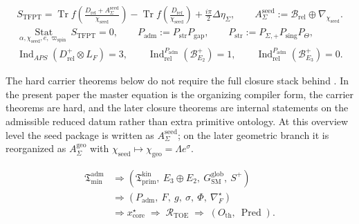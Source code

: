 \documentclass[11pt,a4paper]{article}
\theoremstyle{definition}
\theoremstyle{remark}
\newcommand{\Seam}{\Sigma}
\newcommand{\SM}{\mathrm{SM}}
\newcommand{\Pred}{\operatorname{Pred}}
\newcommand{\Tmin}{\mathfrak T_{\mathrm{min}}}
\newcommand{\Tprim}{\mathfrak T_{\mathrm{prim}}}
\newcommand{\chiseed}{\chi_{\mathrm{seed}}}
\newcommand{\chigeo}{\chi_{\mathrm{geo}}}
\newcommand{\Padm}{P_{\mathrm{adm}}}
\newcommand{\wspin}{\varpi_{\mathrm{spin}}}
\begin{document}
\begin{tcolorbox}[colback=tfptblue!3, colframe=tfptblue, breakable,
    title={TFPT master equation and selectors}, colbacktitle=tfptblue]
\begin{equation}
\label{eq:tfpt-master}
\begin{aligned}
S_{\mathrm{TFPT}}
=
\operatorname{Tr}f\!\left(\frac{D_{\mathrm{rel}}+A_{\Sigma}^{\mathrm{seed}}}{\chiseed}\right)
-
\operatorname{Tr}f\!\left(\frac{D_{\mathrm{ref}}}{\chiseed}\right)
+\frac{i\pi}{2}\Delta\eta_\Sigma,
\qquad
A_{\Sigma}^{\mathrm{seed}}:=\mathcal B_{\mathrm{rel}}\oplus\nabla_{\chiseed}.
\end{aligned}
\end{equation}
\begin{equation}
\label{eq:tfpt-selectors}
\begin{aligned}
\operatorname*{Stat}_{\alpha,\chiseed,e,\wspin}S_{\mathrm{TFPT}}=0,
\qquad
\Padm:=P_{\mathrm{str}}P_{\mathrm{gap}},
\qquad
P_{\mathrm{str}}:=P_{\Seam,+}P_{\mathrm{sing}}P_\Theta,
\\
\operatorname{Ind}_{APS}(D^+_{\mathrm{rel}}\otimes L_F)=3,
\qquad
\operatorname{Ind}^{\Padm}_{\mathrm{rel}}(\mathcal B^+_{E_2})=1,
\qquad
\operatorname{Ind}^{\Padm}_{\mathrm{rel}}(\mathcal B^+_{E_3})=0.
\end{aligned}
\end{equation}
\end{tcolorbox}

The hard carrier theorems below do not require the full closure stack behind
. In the present paper the master equation is the
organizing compiler form, the carrier theorems are hard, and the later closure theorems are
internal statements on the admissible reduced datum rather than extra primitive ontology. At this
overview level the seed package is written as $A_{\Sigma}^{\mathrm{seed}}$; on the later
geometric branch it is reorganized as $A_{\Sigma}^{\mathrm{geo}}$ with
$\chiseed\mapsto\chigeo=\Lambda e^\sigma$.

\begin{tcolorbox}[colback=tfptblue!3, colframe=tfptblue, breakable,
    title={Closed TFPT Chain}, colbacktitle=tfptblue]
\begin{equation}
\label{eq:compiler-chain}
\begin{aligned}
\Tmin^{\mathrm{adm}}
&\Rightarrow
( \Tprim^{\mathrm{kin}},\ E_3\oplus E_2,\ G_{\SM}^{\mathrm{glob}},\ S^+)\\
&\Rightarrow
( \Padm,\ F,\ g,\ \sigma,\ \Phi,\ \nabla_F^\star )\\
&\Rightarrow
x_{\mathrm{core}}^\star
\;\Rightarrow\;
\mathcal R_{\mathrm{TOE}}
\;\Rightarrow\;
(O_{\mathrm{th}},\ \Pred).
\end{aligned}
\end{equation}
\end{tcolorbox}
\end{document}
